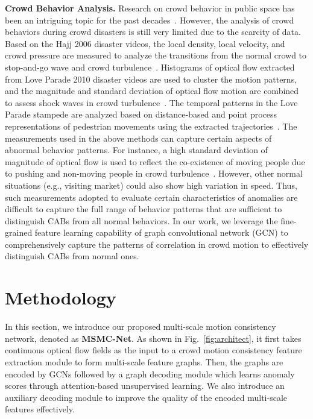 \documentclass[journal]{IEEEtran}
\begin{document}
\noindent\textbf{Crowd Behavior Analysis.} Research on crowd behavior in public space has been an intriguing topic for the past decades~\cite{sanchez2020revisiting}. However, the analysis of crowd behaviors during crowd disasters is still very limited due to the scarcity of data. Based on the Hajj 2006 disaster videos, the local density, local velocity, and crowd pressure are measured to analyze the transitions from the normal crowd to stop-and-go wave and crowd turbulence~\cite{helbing2007dynamics}. Histograms of optical flow extracted from Love Parade 2010 disaster videos are used to cluster the motion patterns, and the magnitude and standard deviation of optical flow motion are combined to assess shock waves in crowd turbulence~\cite{krausz2012loveparade}. The temporal patterns in the Love Parade stampede are analyzed based on distance-based and point process representations of pedestrian movements using the extracted trajectories~\cite{lian2017long}. The measurements used in the above methods can capture certain aspects of abnormal behavior patterns. For instance, a high standard deviation of magnitude of optical flow is used to reflect the co-existence of moving people due to pushing and non-moving people in crowd turbulence~\cite{krausz2012loveparade}. However, other normal situations (e.g., visiting market) could also show high variation in speed. Thus, such measurements adopted to evaluate certain characteristics of anomalies are difficult to capture the full range of behavior patterns that are sufficient to distinguish CABs from all normal behaviors. In our work, we leverage the fine-grained feature learning capability of graph convolutional network (GCN) to comprehensively capture the patterns of correlation in crowd motion to effectively distinguish CABs from normal ones.

\section{Methodology}

In this section, we introduce our proposed multi-scale motion consistency network, denoted as \textbf{MSMC-Net}. As shown in Fig.~\ref{fig:architect}, it first takes continuous optical flow fields as the input to a crowd motion consistency feature extraction module to form multi-scale feature graphs. Then, the graphs are encoded by GCNs followed by a graph decoding module which learns anomaly scores through attention-based unsupervised learning. We also introduce an auxiliary decoding module to improve the quality of the encoded multi-scale features effectively. 
\end{document}
